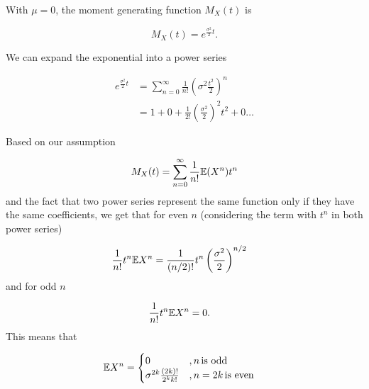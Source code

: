 
With $ \mu = 0$, the moment generating function $ M_{X} (t) $ is

\[
    M_{X} (t) = e^{ \frac{\sigma^2}{2} t} 
.\] 

We can expand the exponential into a power series

\begin{align*}
    e^{ \frac{\sigma^2}{2} t} &= \sum_{n=0}^{\infty} \frac{1}{n!} \left( \sigma^2 \frac{t^2}{2}
    \right)^{n} \\
			      &= 1 + 0 + \frac{1}{2!} \left( \frac{\sigma^2}{2}  \right)^2 t^{2}  +
			      0 \dots
\end{align*}

Based on our assumption 

\[
    M_{X} (t) = \sum_{n=0}^{\infty} \frac{1}{n!} \mathbb{E}(X^{n} ) t^{n}  
\] 
and the fact that two power series represent the same function only if they
have the same coefficients, we get that for even $ n$ (considering the term with $ t^{n} $ in both
power series)

\begin{align*}
    \frac{1}{n!} t^{n}  \mathbb{E} X^{n} &= \frac{1}{(n/2)!} t^{n} \left( \frac{\sigma^2}{2}  \right)^{n/2}  
\end{align*}
and for odd $ n$

\begin{align*}
    \frac{1}{n!} t^{n} \mathbb{E} X^{n} &= 0. 
\end{align*}
This means that 

\begin{align*}
    \mathbb{E} X^{n} &= \begin{cases}
	0 & , n \, \mbox{is odd} \\
	\sigma^{2k} \frac{(2k)!}{2^{k} k!} &, n = 2k \, \mbox{is even} 
    \end{cases}
\end{align*}
